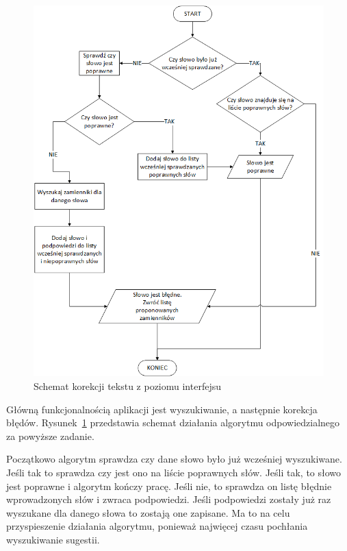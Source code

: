 \begin{figure} [H]
	\centering
	\includegraphics[width=1\linewidth]{rozdzial03/CorectorManager.png}
	\caption{Schemat korekcji tekstu z poziomu interfejsu}
	\label{fig:CorectorManager}
\end{figure}

\newpage

Główną funkcjonalnością aplikacji jest wyszukiwanie, a następnie korekcja błędów. Rysunek~\ref{fig:CorectorManager} przedstawia schemat działania algorytmu odpowiedzialnego za powyższe zadanie. 

Początkowo algorytm sprawdza czy dane słowo było już wcześniej wyszukiwane. Jeśli tak to sprawdza czy jest ono na liście poprawnych słów. Jeśli tak, to słowo jest poprawne i algorytm kończy pracę. Jeśli nie, to sprawdza on listę błędnie wprowadzonych słów i zwraca podpowiedzi. Jeśli podpowiedzi zostały już raz wyszukane dla danego słowa to zostają one zapisane. Ma to na celu przyspieszenie działania algorytmu, ponieważ najwięcej czasu pochłania wyszukiwanie sugestii. 

